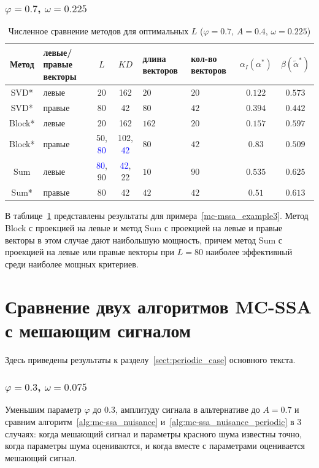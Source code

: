 \documentclass[specialist,
substylefile = spbu_report.rtx,
subf,href,colorlinks=true, 12pt]{disser}
\theoremstyle{definition}
\begin{document}
\subsubsection{$\varphi=0.7$, $\omega=0.225$}
\begin{table}[h]
	\caption{Численное сравнение методов для оптимальных $L$ ($\varphi=0.7$, $A=0.4$, $\omega=0.225$)}
	\label{tab:res_mc-mssa_omega0225}
	\centering
	\begin{tabular}{|c>{\centering\arraybackslash}m{1in}cc>{\centering\arraybackslash}m{1in} >{\centering\arraybackslash}m{0.8in}cc|}\hline
		Метод & левые/правые векторы & $L$ & $KD$ & длина векторов & кол-во векторов & $\alpha_I(\alpha^*)$ & $\beta(\widetilde{\alpha}^*)$ \\
		\hline
		SVD* & левые & $20$ & 162 & $20$ & $20$ & $0.122$ & $0.573$ \\
		\hline
		SVD* & правые & $80$ & 42 & $80$ & $42$ & $0.394$ & $0.442$ \\
		\hline
		Block* & левые & $20$ & 162 & $162$ & $20$ & $0.157$ & $\mathbf{0.597}$ \\
		\hline
		Block* & правые & 50, \textcolor{blue}{80} & 102, \textcolor{blue}{42} & $80$ & $42$ & $0.83$ & $0.509$\\
		\hline
		Sum & левые & \textcolor{blue}{80}, 90 & \textcolor{blue}{42}, 22 & $10$ & $90$ & $0.535$ & $\mathbf{0.625}$ \\
		\hline
		Sum* & правые & $80$ & 42 & $42$ & $42$ & $0.51$ & $\mathbf{0.613}$ \\
		\hline
	\end{tabular}
\end{table}

В таблице~\ref{tab:res_mc-mssa_omega0225} представлены результаты для примера~\ref{mc-mssa_example3}. Метод Block с проекцией на левые и метод Sum с проекцией на левые и правые векторы в этом случае дают наибольшую мощность, причем метод Sum с проекцией на левые или правые векторы при $L=80$ наиболее эффективный среди наиболее мощных критериев.


\section{Сравнение двух алгоритмов MC-SSA с мешающим сигналом}\label{appendix:mc-ssa_nuisance_comp_tables}
Здесь приведены результаты к разделу~\ref{sect:periodic_case} основного текста.
\subsubsection{$\varphi=0.3$, $\omega=0.075$}
Уменьшим параметр $\varphi$ до $0.3$, амплитуду сигнала в альтернативе до $A=0.7$ и сравним алгоритм~\ref{alg:mc-ssa_nuisance} и~\ref{alg:mc-ssa_nuisance_periodic} в 3 случаях: когда мешающий сигнал и параметры красного шума известны точно, когда параметры шума оцениваются, и когда вместе с параметрами оценивается мешающий сигнал.
\end{document}
